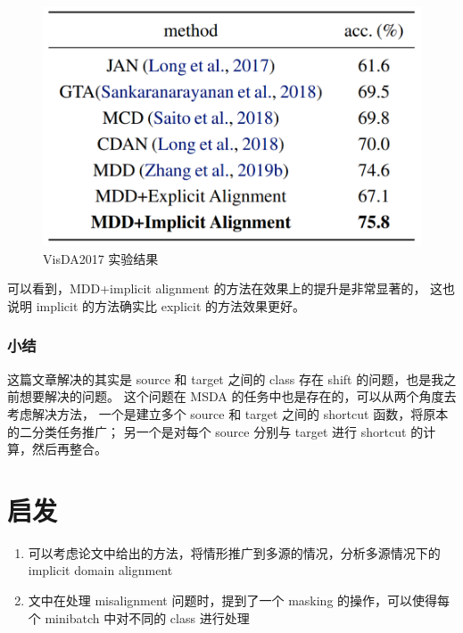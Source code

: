 \documentclass[UTF8]{ctexart}
\begin{document}
                \begin{figure}[ht]
                    \centering
                    \includegraphics[scale=0.4]{Week07_VisDA.png}
                    \caption{VisDA2017 实验结果}
                    \label{fig:VisDA}
                \end{figure}

                可以看到，MDD+implicit alignment 的方法在效果上的提升是非常显著的，
                这也说明 implicit 的方法确实比 explicit 的方法效果更好。
            \subsubsection{小结}
                这篇文章解决的其实是 source 和 target 之间的 class 存在 shift 的问题，也是我之前想要解决的问题。
                这个问题在 MSDA 的任务中也是存在的，可以从两个角度去考虑解决方法，
                一个是建立多个 source 和 target 之间的 shortcut 函数，将原本的二分类任务推广；
                另一个是对每个 source 分别与 target 进行 shortcut 的计算，然后再整合。
    \section{启发}
        \begin{enumerate}
            \item 可以考虑论文中给出的方法，将情形推广到多源的情况，分析多源情况下的 implicit domain alignment
            \item 文中在处理 misalignment 问题时，提到了一个 masking 的操作，可以使得每个 minibatch 中对不同的 class 进行处理
        \end{enumerate}
\end{document}
